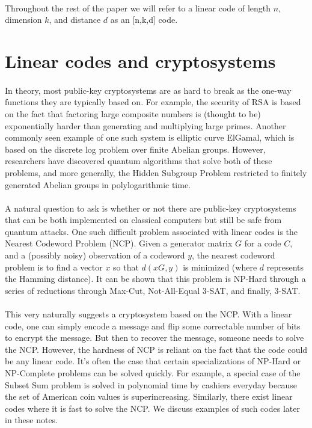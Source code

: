 \documentclass[15pt]{article}
\theoremstyle{definition}
\begin{document}
\paragraph{}
Throughout the rest of the paper we will refer to a linear code of length $n$, dimension $k$, and distance $d$ as an [n,k,d] code.  

\section{Linear codes and cryptosystems}
\paragraph{}
In theory, most public-key cryptosystems are as hard to break as the one-way functions they are typically based on. For example, the security of RSA is based on the fact that factoring large composite numbers is (thought to be) exponentially harder than generating and multiplying large primes. Another commonly seen example of one such system is elliptic curve ElGamal, which is based on the discrete log problem over finite Abelian groups. However, researchers have discovered quantum algorithms that solve both of these problems, and more generally, the Hidden Subgroup Problem restricted to finitely generated Abelian groups in polylogarithmic time.

\paragraph{}
A natural question to ask is whether or not there are public-key cryptosystems that can be both implemented on classical computers but still be safe from quantum attacks. One such difficult problem associated with linear codes is the Nearest Codeword Problem (NCP). Given a generator matrix $G$ for a code $C$, and a (possibly noisy) observation of a codeword $y$, the nearest codeword problem is to find a vector $x$ so that $d(xG, y)$ is minimized (where $d$ represents the Hamming distance). It can be shown that this problem is NP-Hard through a series of reductions through Max-Cut, Not-All-Equal 3-SAT, and finally, 3-SAT.

\paragraph{}
This very naturally suggests a cryptosystem based on the NCP. With a linear code, one can simply encode a message and flip some correctable number of bits to encrypt the message. But then to recover the message, someone needs to solve the NCP. However, the hardness of NCP is reliant on the fact that the code could be any linear code. It's often the case that certain specializations of NP-Hard or NP-Complete problems can be solved quickly. For example, a special case of the Subset Sum problem is solved in polynomial time by cashiers everyday because the set of American coin values is superincreasing. Similarly, there exist linear codes where it is fast to solve the NCP. We discuss examples of such codes later in these notes. 
\end{document}
